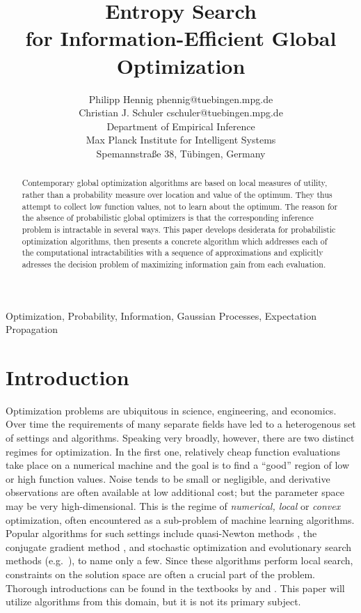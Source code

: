 \documentclass[twoside,11pt]{article}
\title{Entropy Search\\ for Information-Efficient Global Optimization}
\author{\name Philipp Hennig \email phennig@tuebingen.mpg.de\\
\name Christian J. Schuler \email cschuler@tuebingen.mpg.de\\
\addr Department of Empirical Inference\\ 
Max Planck Institute for Intelligent Systems\\
Spemannstra\ss e 38, T\"ubingen, Germany}
\begin{document}
\maketitle

\begin{abstract}
  Contemporary global optimization algorithms are based on local
  measures of utility, rather than a probability measure over location
  and value of the optimum. They thus attempt to collect low function
  values, not to learn about the optimum. The reason for the absence
  of probabilistic global optimizers is that the corresponding
  inference problem is intractable in several ways. This paper
  develops desiderata for probabilistic optimization algorithms, then
  presents a concrete algorithm which addresses each of the
  computational intractabilities with a sequence of approximations and
  explicitly adresses the decision problem of maximizing information
  gain from each evaluation.
\end{abstract}

\begin{keywords}
  Optimization, Probability, Information, Gaussian
  Processes, Expectation Propagation
\end{keywords}

\section{Introduction}
\label{sec:introduction}

Optimization problems are ubiquitous in science, engineering, and
economics. Over time the requirements of many separate fields have led
to a heterogenous set of settings and algorithms. Speaking very
broadly, however, there are two distinct regimes for optimization. In
the first one, relatively cheap function evaluations take place on a
numerical machine and the goal is to find a ``good'' region of low or
high function values. Noise tends to be small or negligible, and
derivative observations are often available at low additional cost;
but the parameter space may be very high-dimensional. This is the
regime of \emph{numerical, local} or \emph{convex} optimization, often
encountered as a sub-problem of machine learning algorithms. Popular
algorithms for such settings include quasi-Newton methods
\citep{broyden1965class,fletcher1970new,goldfarb1970family,shanno1970conditioning},
the conjugate gradient method \citep{hestenes1952methods}, and
stochastic optimization and evolutionary search methods (e.g.\
\citet{hansen2001completely}), to name only a few. Since these
algorithms perform local search, constraints on the solution space are
often a crucial part of the problem. Thorough introductions can be
found in the textbooks by \citet{nocedal1999numerical} and
\citet{boyd2004convex}. This paper will utilize algorithms from this
domain, but it is not its primary subject.
\end{document}
